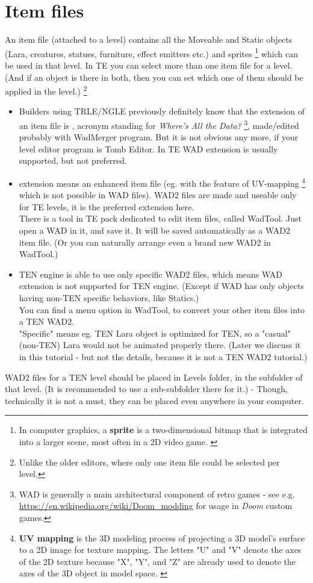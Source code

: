 \section{Item files}
An item file (attached to a level) contains all the Moveable and Static objects (Lara, creatures, statues, furniture, effect emitters etc.) and sprites \footnote{In computer graphics, a \textbf{sprite} is a two-dimensional bitmap that is integrated into a larger scene, most often in a 2D video game. \cite{sprite_wikipedia} } which can be used in that level.
In TE you can select more than one item file for a level. (And if an object is there in both, then you can set which one of them should be applied in the level.)
\footnote{Unlike the older editors, where only one item file could be selected per level.}
\begin {itemize}
    \item \par Builders using TRLE/NGLE previously definitely know that the extension of an item file is , acronym standing for \emph{Where's All the Data?} \footnote{WAD is generally a main architectural component of retro games - see e.g. \url{https://en.wikipedia.org/wiki/Doom_modding} for usage in \emph{Doom} custom games.}, made/edited probably with WadMerger program. But it is not obvious any more, if your level editor program is Tomb Editor. In TE WAD extension is usually supported, but not preferred.
    \item {} extension means an enhanced item file (eg. with the feature of UV-mapping \footnote{\textbf{UV mapping} is the 3D modeling process of projecting a 3D model's surface to a 2D image for texture mapping. The letters "U" and "V" denote the axes of the 2D texture because "X", "Y", and "Z" are already used to denote the axes of the 3D object in model space. \cite{UV_mapping_wikipedia} } which is not possible in WAD files). WAD2 files are made and useable only for TE levels, it is the preferred extension here. \\ There is a tool in TE pack dedicated to edit item files, called WadTool. Just open a WAD in it, and save it. It will be saved automatically as a WAD2 item file. (Or you can naturally arrange even a brand new WAD2 in WadTool.)
    \item TEN engine is able to use only specific WAD2 files, which means WAD extension is not supported for TEN engine. (Except if WAD has only objects having non-TEN specific behaviors, like Statics.) \\ You can find a menu option in WadTool, to convert your other item files into a TEN WAD2. \\ "Specific" means eg. TEN Lara object is optimized for TEN, so a "casual" (non-TEN) Lara would not be animated properly there. (Later we discuss it in this tutorial - but not the details, because it is not a TEN WAD2 tutorial.)
\end{itemize}
WAD2 files for a TEN level should be placed in Levels folder, in the subfolder of that level. (It is recommended to use a sub-subfolder there for it.) - Though, technically it is not a must, they can be placed even anywhere in your computer.

